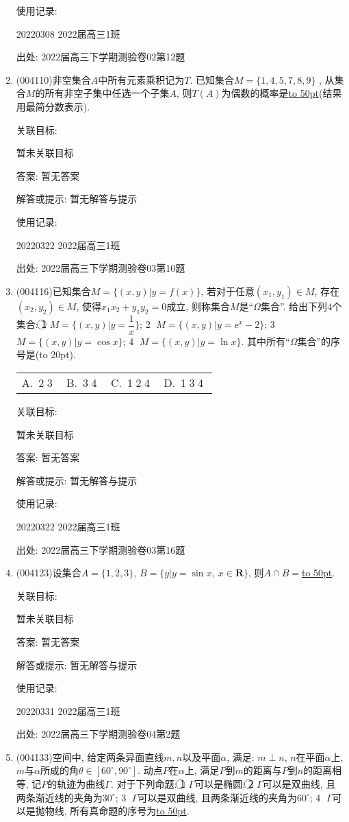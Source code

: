 \documentclass[10pt,a4paper]{article}
\newcommand{\blank}[1]{\underline{\hbox to #1pt{}}}
\newcommand{\bracket}[1]{(\hbox to #1pt{})}
\newcommand{\fourch}[4]{\par\begin{tabular}{p{.23\textwidth}p{.23\textwidth}p{.23\textwidth}p{.23\textwidth}}
A.~#1 &B.~#2& C.~#3& D.~#4
\end{tabular}}
\begin{document}
\begin{enumerate}[1.]
使用记录:

20220308	2022届高三1班	


出处: 2022届高三下学期测验卷02第12题
\item { (004110)}非空集合$A$中所有元素乘积记为$T$. 已知集合$M=\{1,4,5,7,8,9\}$ , 从集合$M$的所有非空子集中任选一个子集$A$, 则$T(A)$为偶数的概率是\blank{50}(结果用最简分数表示).


关联目标:

暂未关联目标

答案: 暂无答案

解答或提示: 暂无解答与提示

使用记录:

20220322	2022届高三1班	


出处: 2022届高三下学期测验卷03第10题
\item { (004116)}已知集合$M=\{(x,y)|y=f(x)\}$, 若对于任意$(x_1,y_1)\in M$, 存在$(x_2,y_2)\in M$, 使得$x_1x_2+y_1y_2=0$成立, 则称集合$M$是``$\Omega$集合''. 给出下列$4$个集合:
\textcircled{1} $M=\{(x,y) |y=\dfrac 1x \}$; \textcircled{2} $M=\{(x,y)|y=\mathrm{e}^x-2\}$; \textcircled{3} $M=\{(x,y)|y=\cos x\}$; \textcircled{4} $M=\{(x,y)|y=\ln x\}$.
其中所有``$\Omega$集合''的序号是\bracket{20}.
\fourch{\textcircled{2}\textcircled{3}}{\textcircled{3}\textcircled{4}}{\textcircled{1}\textcircled{2}\textcircled{4}}{\textcircled{1}\textcircled{3}\textcircled{4}}


关联目标:

暂未关联目标

答案: 暂无答案

解答或提示: 暂无解答与提示

使用记录:

20220322	2022届高三1班	


出处: 2022届高三下学期测验卷03第16题
\item { (004123)}设集合$A=\{1,2,3\}$, $B=\{y|y=\sin x, \ x\in \mathbf{R}\}$, 则$A\cap B=$\blank{50}.


关联目标:

暂未关联目标

答案: 暂无答案

解答或提示: 暂无解答与提示

使用记录:

20220331	2022届高三1班	


出处: 2022届高三下学期测验卷04第2题
\item { (004133)}空间中, 给定两条异面直线$m,n$以及平面$\alpha$, 满足: $m\perp n$, $n$在平面$\alpha$上, $m$与$\alpha$所成的角$\theta\in [60^\circ,90^\circ]$. 动点$P$在$\alpha$上, 满足$P$到$m$的距离与$P$到$n$的距离相等, 记$P$的轨迹为曲线$\Gamma$. 对于下列命题: \textcircled{1} $\Gamma$可以是椭圆; \textcircled{2} $\Gamma$可以是双曲线, 且两条渐近线的夹角为$30^\circ$; \textcircled{3} $\Gamma$可以是双曲线, 且两条渐近线的夹角为$60^\circ$; \textcircled{4} $\Gamma$可以是抛物线, 所有真命题的序号为\blank{50}.



\end{enumerate}
\end{document}
